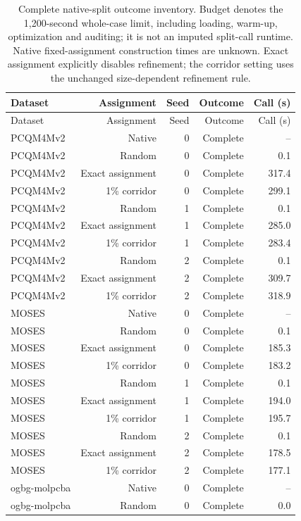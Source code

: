 \begin{longtable}{lrrrr}
\caption{Complete native-split outcome inventory. Budget denotes the 1,200-second whole-case limit, including loading, warm-up, optimization and auditing; it is not an imputed split-call runtime. Native fixed-assignment construction times are unknown. Exact assignment explicitly disables refinement; the corridor setting uses the unchanged size-dependent refinement rule.}\\
\toprule
Dataset & Assignment & Seed & Outcome & Call (s)\\\midrule
\endfirsthead
\toprule
Dataset & Assignment & Seed & Outcome & Call (s)\\\midrule
\endhead
\midrule\endfoot
\bottomrule\endlastfoot
PCQM4Mv2 & Native & 0 & Complete & --\\
PCQM4Mv2 & Random & 0 & Complete & 0.1\\
PCQM4Mv2 & Exact assignment & 0 & Complete & 317.4\\
PCQM4Mv2 & 1\% corridor & 0 & Complete & 299.1\\
PCQM4Mv2 & Random & 1 & Complete & 0.1\\
PCQM4Mv2 & Exact assignment & 1 & Complete & 285.0\\
PCQM4Mv2 & 1\% corridor & 1 & Complete & 283.4\\
PCQM4Mv2 & Random & 2 & Complete & 0.1\\
PCQM4Mv2 & Exact assignment & 2 & Complete & 309.7\\
PCQM4Mv2 & 1\% corridor & 2 & Complete & 318.9\\
MOSES & Native & 0 & Complete & --\\
MOSES & Random & 0 & Complete & 0.1\\
MOSES & Exact assignment & 0 & Complete & 185.3\\
MOSES & 1\% corridor & 0 & Complete & 183.2\\
MOSES & Random & 1 & Complete & 0.1\\
MOSES & Exact assignment & 1 & Complete & 194.0\\
MOSES & 1\% corridor & 1 & Complete & 195.7\\
MOSES & Random & 2 & Complete & 0.1\\
MOSES & Exact assignment & 2 & Complete & 178.5\\
MOSES & 1\% corridor & 2 & Complete & 177.1\\
ogbg-molpcba & Native & 0 & Complete & --\\
ogbg-molpcba & Random & 0 & Complete & 0.0\\

\end{longtable}

